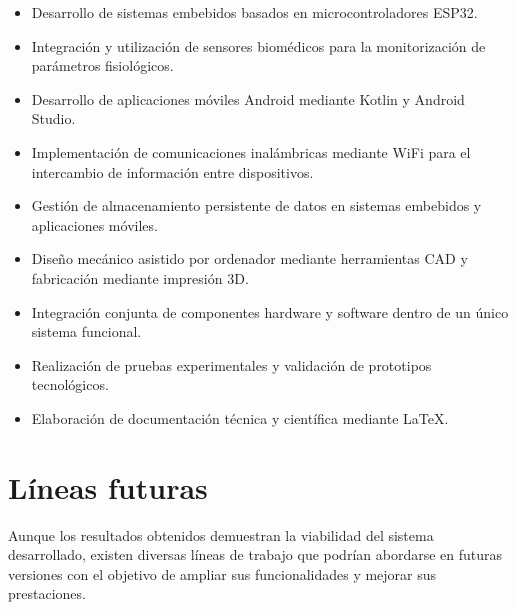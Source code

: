 \begin{itemize}

\item Desarrollo de sistemas embebidos basados en microcontroladores ESP32.

\item Integración y utilización de sensores biomédicos para la monitorización de parámetros fisiológicos.

\item Desarrollo de aplicaciones móviles Android mediante Kotlin y Android Studio.

\item Implementación de comunicaciones inalámbricas mediante WiFi para el intercambio de información entre dispositivos.

\item Gestión de almacenamiento persistente de datos en sistemas embebidos y aplicaciones móviles.

\item Diseño mecánico asistido por ordenador mediante herramientas CAD y fabricación mediante impresión 3D.

\item Integración conjunta de componentes hardware y software dentro de un único sistema funcional.

\item Realización de pruebas experimentales y validación de prototipos tecnológicos.

\item Elaboración de documentación técnica y científica mediante \LaTeX.

\end{itemize}

\section{Líneas futuras}

Aunque los resultados obtenidos demuestran la viabilidad del sistema desarrollado, existen diversas líneas de trabajo que podrían abordarse en futuras versiones con el objetivo de ampliar sus funcionalidades y mejorar sus prestaciones.

